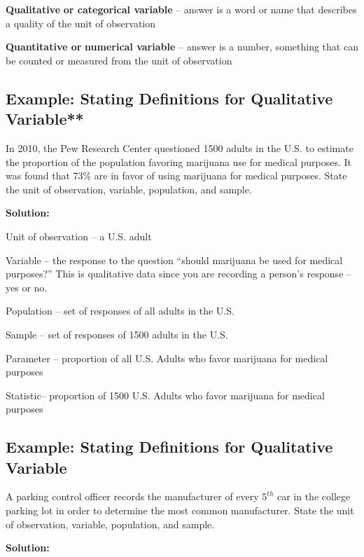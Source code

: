 \documentclass[
]{book}
\begin{document}
\textbf{Qualitative} \textbf{or categorical variable} -- answer is a word or name that describes a quality of the unit of observation

\textbf{Quantitative or} \textbf{numerical variable} -- answer is a number, something that can be counted or measured from the unit of observation

\hypertarget{example-stating-definitions-for-qualitative-variable}{%
\subsection{Example: Stating Definitions for Qualitative Variable**}\label{example-stating-definitions-for-qualitative-variable}}

In 2010, the Pew Research Center questioned 1500 adults in the U.S. to estimate the proportion of the population favoring marijuana use for medical purposes. It was found that 73\% are in favor of using marijuana for medical purposes. State the unit of observation, variable, population, and sample.

\textbf{Solution:}

Unit of observation -- a U.S. adult

Variable -- the response to the question ``should marijuana be used for medical purposes?'' This is qualitative data since you are recording a person's response -- yes or no.

Population -- set of responses of all adults in the U.S.

Sample -- set of responses of 1500 adults in the U.S.

Parameter -- proportion of all U.S. Adults who favor marijuana for medical purposes

Statistic-- proportion of 1500 U.S. Adults who favor marijuana for medical purposes

\hypertarget{example-stating-definitions-for-qualitative-variable-1}{%
\subsection{Example: Stating Definitions for Qualitative Variable}\label{example-stating-definitions-for-qualitative-variable-1}}

A parking control officer records the manufacturer of every \(5^{th}\) car in the college parking lot in order to determine the most common manufacturer. State the unit of observation, variable, population, and sample.

\textbf{Solution:}
\end{document}
